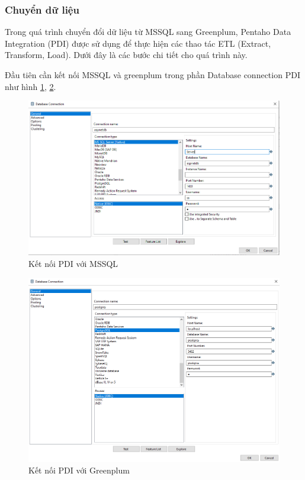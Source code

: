 \documentclass{article}[14pt]
\begin{document}
\subsubsection{Chuyển dữ liệu}

Trong quá trình chuyển đổi dữ liệu từ MSSQL sang Greenplum, Pentaho Data Integration (PDI) được sử dụng để thực hiện các thao tác ETL (Extract, Transform, Load). Dưới đây là các bước chi tiết cho quá trình này.

Đầu tiên cần kết nối MSSQL và greenplum trong phần Database connection PDI như hình \ref{fig:ConMSSQL}, \ref{fig:ConGreenplum}.


\begin{figure}
    \centering
    \includegraphics[width=0.8\linewidth]{images/ConMSSQL.png}
    \caption{Kết nối PDI với MSSQL}
    \label{fig:ConMSSQL}
\end{figure}


\begin{figure}
    \centering
    \includegraphics[width=0.8\linewidth]{images/ConGreenplum.png}
    \caption{Kết nối PDI với Greenplum}
    \label{fig:ConGreenplum}
\end{figure}
\end{document}

